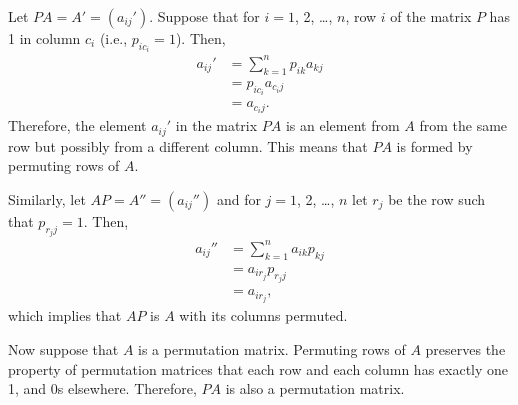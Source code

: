 Let $PA=A'=(a_{ij}')$.
Suppose that for $i=1$, 2, \dots, $n$, row $i$ of the matrix $P$ has 1 in column $c_i$ (i.e., $p_{ic_i}=1$).
Then,
\begin{align*}
    a_{ij}' &= \sum_{k=1}^np_{ik}a_{kj} \\
    &= p_{ic_i}a_{c_ij} \\
    &= a_{c_ij}.
\end{align*}
Therefore, the element $a_{ij}'$ in the matrix $PA$ is an element from $A$ from the same row but possibly from a different column.
This means that $PA$ is formed by permuting rows of $A$.

Similarly, let $AP=A''=(a_{ij}'')$ and for $j=1$, 2, \dots, $n$ let $r_j$ be the row such that $p_{r_jj}=1$.
Then,
\begin{align*}
    a_{ij}'' &= \sum_{k=1}^na_{ik}p_{kj} \\
    &= a_{ir_j}p_{r_jj} \\
    &= a_{ir_j},
\end{align*}
which implies that $AP$ is $A$ with its columns permuted.

Now suppose that $A$ is a permutation matrix.
Permuting rows of $A$ preserves the property of permutation matrices that each row and each column has exactly one 1, and 0s elsewhere.
Therefore, $PA$ is also a permutation matrix.
